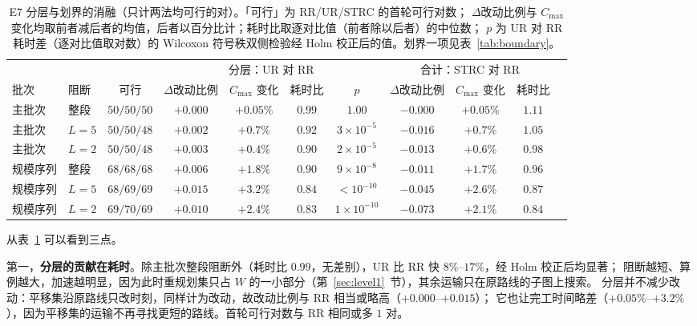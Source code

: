 \documentclass[manuscript,screen,review]{acmart}
\providecommand{\STRC}{\textsc{STRC}}
\begin{document}
\begin{table}[t]
\centering
\caption{E7 分层与划界的消融（只计两法均可行的对）。「可行」为 RR/UR/\STRC{} 的首轮可行对数；
\(\Delta\)改动比例与 \(C_{\max}\) 变化均取前者减后者的均值，后者以百分比计；耗时比取逐对比值（前者除以后者）的中位数；
\(p\) 为 UR 对 RR 耗时差（逐对比值取对数）的 Wilcoxon 符号秩双侧检验经 Holm 校正后的值。划界一项见表~\ref{tab:boundary}。}
\label{tab:ablation}
\small
\setlength{\tabcolsep}{3pt}
\begin{tabular}{@{}llccccccccc@{}}
\toprule
 & & & \multicolumn{4}{c}{分层：UR 对 RR} & \multicolumn{3}{c}{合计：\STRC{} 对 RR} \\
\cmidrule(lr){4-7}\cmidrule(l){8-10}
批次 & 阻断 & 可行 & \(\Delta\)改动比例 & \(C_{\max}\) 变化 & 耗时比 & \(p\) & \(\Delta\)改动比例 & \(C_{\max}\) 变化 & 耗时比 \\
\midrule
主批次 & 整段 & \(50/50/50\) & \(+0.000\) & \(+0.05\%\) & \(0.99\) & \(1.00\) & \(-0.000\) & \(+0.05\%\) & \(1.11\) \\
主批次 & \(L=5\) & \(50/50/48\) & \(+0.002\) & \(+0.7\%\) & \(0.92\) & \(3\times10^{-5}\) & \(-0.016\) & \(+0.7\%\) & \(1.05\) \\
主批次 & \(L=2\) & \(50/50/48\) & \(+0.003\) & \(+0.4\%\) & \(0.90\) & \(2\times10^{-5}\) & \(-0.013\) & \(+0.6\%\) & \(0.98\) \\
\addlinespace[2pt]
规模序列 & 整段 & \(68/68/68\) & \(+0.006\) & \(+1.8\%\) & \(0.90\) & \(9\times10^{-8}\) & \(-0.011\) & \(+1.7\%\) & \(0.96\) \\
规模序列 & \(L=5\) & \(68/69/69\) & \(+0.015\) & \(+3.2\%\) & \(0.84\) & \(<10^{-10}\) & \(-0.045\) & \(+2.6\%\) & \(0.87\) \\
规模序列 & \(L=2\) & \(69/70/69\) & \(+0.010\) & \(+2.4\%\) & \(0.83\) & \(1\times10^{-10}\) & \(-0.073\) & \(+2.1\%\) & \(0.84\) \\
\bottomrule
\end{tabular}
\end{table}

从表~\ref{tab:ablation} 可以看到三点。

第一，\textbf{分层的贡献在耗时}。除主批次整段阻断外（耗时比 \(0.99\)，无差别），UR 比 RR 快 \(8\%\)--\(17\%\)，经 Holm 校正后均显著；
阻断越短、算例越大，加速越明显，因为此时重规划集只占 \(W\) 的一小部分（第~\ref{sec:level1}~节），其余运输只在原路线的子图上搜索。
分层并不减少改动：平移集沿原路线只改时刻，同样计为改动，故改动比例与 RR 相当或略高（\(+0.000\)--\(+0.015\)）；
它也让完工时间略差（\(+0.05\%\)--\(+3.2\%\)），因为平移集的运输不再寻找更短的路线。首轮可行对数与 RR 相同或多 \(1\) 对。
\end{document}
